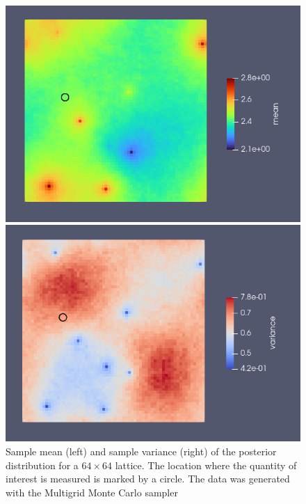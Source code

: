 \documentclass[11pt]{article}
\begin{document}
\begin{figure}
    \begin{center}
        \begin{minipage}{0.45\linewidth}
            \includegraphics[width=\linewidth]{mean.png}
        \end{minipage}
        \hfill
        \begin{minipage}{0.45\linewidth}
            \includegraphics[width=\linewidth]{variance.png}
        \end{minipage}
    \end{center}
    \caption{Sample mean (left) and sample variance (right) of the posterior distribution for a $64\times 64$ lattice. The location where the quantity of interest is measured is marked by a circle. The data was generated with the Multigrid Monte Carlo sampler}
    \label{fig:mean_variance}
\end{figure}
\end{document}
